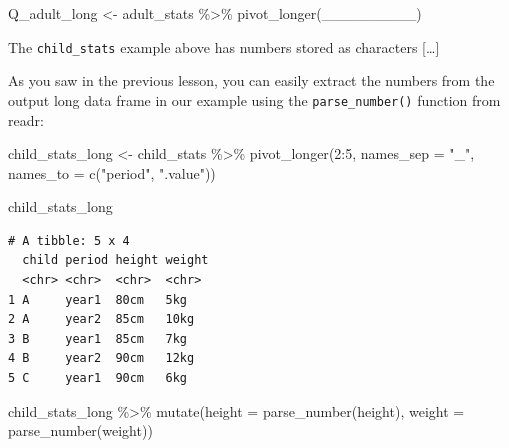 \documentclass[
  letterpaper,
  DIV=11,
  numbers=noendperiod]{scrreprt}
\newenvironment{Shaded}{\begin{snugshade}}{\end{snugshade}}
\newcommand{\AttributeTok}[1]{\textcolor[rgb]{0.40,0.45,0.13}{#1}}
\newcommand{\DecValTok}[1]{\textcolor[rgb]{0.68,0.00,0.00}{#1}}
\newcommand{\FunctionTok}[1]{\textcolor[rgb]{0.28,0.35,0.67}{#1}}
\newcommand{\NormalTok}[1]{\textcolor[rgb]{0.00,0.23,0.31}{#1}}
\newcommand{\OtherTok}[1]{\textcolor[rgb]{0.00,0.23,0.31}{#1}}
\newcommand{\SpecialCharTok}[1]{\textcolor[rgb]{0.37,0.37,0.37}{#1}}
\newcommand{\StringTok}[1]{\textcolor[rgb]{0.13,0.47,0.30}{#1}}
\begin{document}
\begin{tcolorbox}
\begin{Shaded}
\begin{Highlighting}[]
\NormalTok{Q\_adult\_long }\OtherTok{\textless{}{-}}
\NormalTok{  adult\_stats }\SpecialCharTok{\%\textgreater{}\%}
  \FunctionTok{pivot\_longer}\NormalTok{(\_\_\_\_\_\_\_\_\_)}
\end{Highlighting}
\end{Shaded}

\end{tcolorbox}

\begin{tcolorbox}[enhanced jigsaw, title=\textcolor{quarto-callout-note-color}{\faInfo}\hspace{0.5em}{Side Note}, colbacktitle=quarto-callout-note-color!10!white, leftrule=.75mm, arc=.35mm, opacityback=0, bottomrule=.15mm, rightrule=.15mm, toptitle=1mm, breakable, toprule=.15mm, colback=white, coltitle=black, colframe=quarto-callout-note-color-frame, bottomtitle=1mm, titlerule=0mm, left=2mm, opacitybacktitle=0.6]

The \texttt{child\_stats} example above has numbers stored as characters
{[}\ldots{]}

As you saw in the previous lesson, you can easily extract the numbers
from the output long data frame in our example using the
\texttt{parse\_number()} function from readr:

\begin{Shaded}
\begin{Highlighting}[]
\NormalTok{child\_stats\_long }\OtherTok{\textless{}{-}} 
\NormalTok{  child\_stats }\SpecialCharTok{\%\textgreater{}\%} 
  \FunctionTok{pivot\_longer}\NormalTok{(}\DecValTok{2}\SpecialCharTok{:}\DecValTok{5}\NormalTok{, }
               \AttributeTok{names\_sep =} \StringTok{"\_"}\NormalTok{,}
               \AttributeTok{names\_to =} \FunctionTok{c}\NormalTok{(}\StringTok{"period"}\NormalTok{, }\StringTok{".value"}\NormalTok{))}

\NormalTok{child\_stats\_long}
\end{Highlighting}
\end{Shaded}

\begin{verbatim}
# A tibble: 5 x 4
  child period height weight
  <chr> <chr>  <chr>  <chr> 
1 A     year1  80cm   5kg   
2 A     year2  85cm   10kg  
3 B     year1  85cm   7kg   
4 B     year2  90cm   12kg  
5 C     year1  90cm   6kg   
\end{verbatim}

\begin{Shaded}
\begin{Highlighting}[]
\NormalTok{child\_stats\_long }\SpecialCharTok{\%\textgreater{}\%} 
  \FunctionTok{mutate}\NormalTok{(}\AttributeTok{height =} \FunctionTok{parse\_number}\NormalTok{(height), }
         \AttributeTok{weight =} \FunctionTok{parse\_number}\NormalTok{(weight))}
\end{Highlighting}
\end{Shaded}


\end{tcolorbox}
\end{document}
